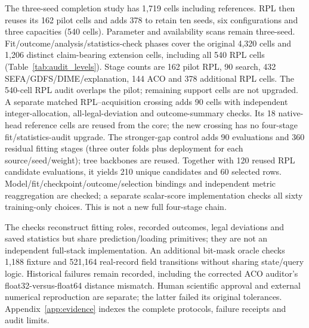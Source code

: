 \documentclass[11pt]{article}
\begin{document}
The three-seed completion study has 1,719 cells including references. RPL then
reuses its 162 pilot cells and adds 378 to retain ten seeds, six configurations
and three capacities (540 cells). Parameter and availability scans remain
three-seed. Fit/outcome/analysis/statistics-check phases cover the original
4,320 cells and 1,206 distinct claim-bearing extension cells, including all
540 RPL cells (Table~\ref{tab:audit_levels}). Stage counts are 162 pilot RPL, 90 search, 432 SEFA/GDFS/DIME/explanation,
144 ACO and 378 additional RPL cells. The 540-cell RPL audit overlaps the
pilot; remaining support cells are not upgraded. A separate matched
RPL--acquisition crossing adds 90 cells with independent integer-allocation,
all-legal-deviation and outcome-summary checks. Its 18 native-head reference
cells are reused from the core; the new crossing has no four-stage
fit/statistics-audit upgrade. The stronger-gap control adds 90 evaluations
and 360 residual fitting stages (three outer folds plus deployment for each
source/seed/weight); tree backbones are reused. Together with 120 reused RPL
candidate evaluations, it yields 210 unique candidates and 60 selected rows.
Model/fit/checkpoint/outcome/selection bindings and independent metric
reaggregation are checked; a separate scalar-score implementation checks
all sixty training-only choices. This is not a new full four-stage chain.

The checks reconstruct fitting roles, recorded outcomes, legal deviations
and saved statistics but share prediction/loading primitives; they are not
an independent full-stack implementation. An additional bit-mask oracle
checks 1,188 fixture and 521,164 real-record field transitions without sharing
state/query logic. Historical failures remain recorded, including the corrected
ACO auditor's float32-versus-float64 distance mismatch. Human scientific
approval and external numerical reproduction are separate; the latter failed
its original tolerances. Appendix~\ref{app:evidence} indexes the complete
protocols, failure receipts and audit limits.
\end{document}
